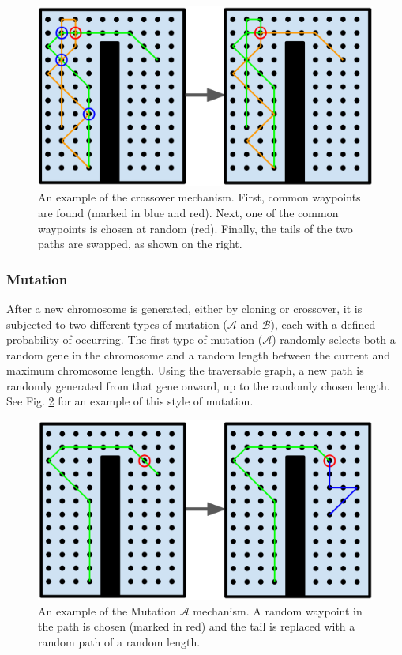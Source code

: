 \documentclass[letterpaper, 10 pt, conference]{ieeeconf}  %
\begin{document}
\begin{figure}
\centering
\includegraphics[width=0.8\linewidth]{figures/crossover.png}
\caption{An example of the crossover mechanism. First, common waypoints are found (marked in blue and red). Next, one of the common waypoints is chosen at random (red). Finally, the tails of the two paths are swapped, as shown on the right.}
\label{fig:crossover}
\end{figure}

\subsubsection{Mutation}

After a new chromosome is generated, either by cloning or crossover, it is subjected to two different types of mutation ($\mathcal{A}$ and $\mathcal{B}$), each with a defined probability of occurring. The first type of mutation ($\mathcal{A}$) randomly selects both a random gene in the chromosome and a random length between the current and maximum chromosome length. Using the traversable graph, a new path is randomly generated from that gene onward, up to the randomly chosen length. See Fig. \ref{fig:mutation} for an example of this style of mutation.

\begin{figure}
\centering
\includegraphics[width=0.8\linewidth]{figures/mutation.png}
\caption{An example of the Mutation $\mathcal{A}$ mechanism. A random waypoint in the path is chosen (marked in red) and the tail is replaced with a random path of a random length.}
\label{fig:mutation}
\end{figure}
\end{document}
